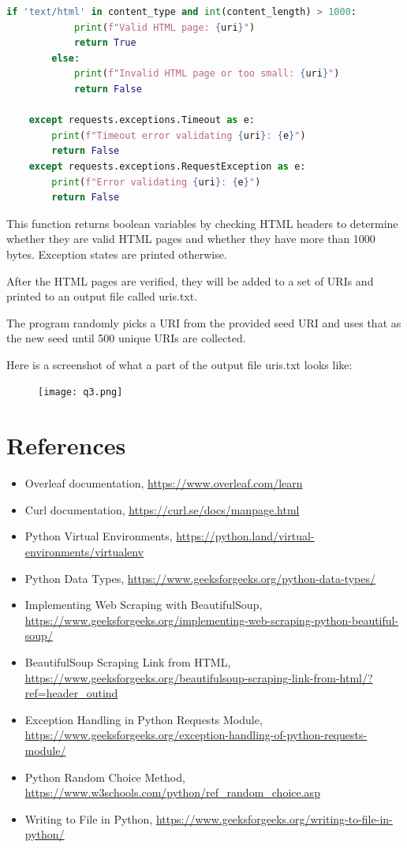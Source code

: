 \documentclass[12pt]{article}
\begin{document}
\begin{enumerate}
\begin{lstlisting}[language=Python, label=1st:copy]
        if 'text/html' in content_type and int(content_length) > 1000:
            print(f"Valid HTML page: {uri}")
            return True
        else:
            print(f"Invalid HTML page or too small: {uri}")
            return False
    
    except requests.exceptions.Timeout as e:
        print(f"Timeout error validating {uri}: {e}")
        return False
    except requests.exceptions.RequestException as e:
        print(f"Error validating {uri}: {e}")
        return False
     \end{lstlisting}
    This function returns boolean variables by checking HTML headers to determine whether they are valid HTML pages and whether they have more than 1000 bytes. Exception states are printed otherwise.

    After the HTML pages are verified, they will be added to a set of URIs and printed to an output file called uris.txt.  
     
\end{enumerate}

The program randomly picks a URI from the provided seed URI and uses that as the new seed until 500 unique URIs are collected.

Here is a screenshot of what a part of the output file uris.txt looks like:
\begin{figure}[h!]
    \centering
    \texttt{[image: q3.png]}
    \label{fig:q3}
\end{figure}

\section*{References}

\begin{itemize}
    \item {Overleaf documentation, \url{https://www.overleaf.com/learn}}
    \item {Curl documentation, \url{https://curl.se/docs/manpage.html}}
    \item {Python Virtual Environments, \url{https://python.land/virtual-environments/virtualenv}}
    \item{Python Data Types, \url{https://www.geeksforgeeks.org/python-data-types/}}
    \item{Implementing Web Scraping with BeautifulSoup, \url{https://www.geeksforgeeks.org/implementing-web-scraping-python-beautiful-soup/}}
    \item{BeautifulSoup Scraping Link from HTML, \url{https://www.geeksforgeeks.org/beautifulsoup-scraping-link-from-html/?ref=header_outind}}
    \item{Exception Handling in Python Requests Module, \url{https://www.geeksforgeeks.org/exception-handling-of-python-requests-module/}}
    \item{Python Random Choice Method, \url{https://www.w3schools.com/python/ref_random_choice.asp}}
    \item{Writing to File in Python, \url{https://www.geeksforgeeks.org/writing-to-file-in-python/}}
\end{itemize}
\end{document}
